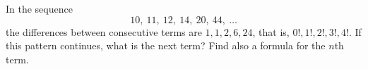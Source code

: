In the sequence
\[10,\ 11,\ 12,\ 14,\ 20,\ 44,\ \dots\]
the differences between consecutive terms are $1,1,2,6,24$, that is, $0!,1!,2!,3!,4!$. If this pattern continues, what is the next term? Find also a formula for the $n$th term.
